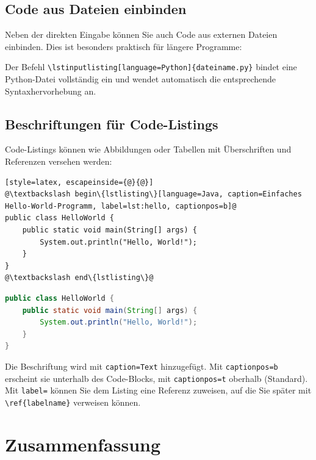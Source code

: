 \subsection{Code aus Dateien einbinden}

Neben der direkten Eingabe können Sie auch Code aus externen Dateien einbinden. Dies ist besonders praktisch für längere Programme:

Der Befehl \texttt{\textbackslash lstinputlisting[language=Python]\{dateiname.py\}} bindet eine Python-Datei vollständig ein und wendet automatisch die entsprechende Syntaxhervorhebung an.



\subsection{Beschriftungen für Code-Listings}

Code-Listings können wie Abbildungen oder Tabellen mit Überschriften und Referenzen versehen werden:

\begin{lstlisting}[style=latex, escapeinside={@}{@}]
@\textbackslash begin\{lstlisting\}[language=Java, caption=Einfaches Hello-World-Programm, label=lst:hello, captionpos=b]@
public class HelloWorld {
    public static void main(String[] args) {
        System.out.println("Hello, World!");
    }
}
@\textbackslash end\{lstlisting\}@
\end{lstlisting}

\begin{ausgabe}
\begin{lstlisting}[language=Java, caption=Einfaches Hello-World-Programm, label=lst:hello, captionpos=b]
public class HelloWorld {
    public static void main(String[] args) {
        System.out.println("Hello, World!");
    }
}
\end{lstlisting}
\end{ausgabe}

Die Beschriftung wird mit \texttt{caption=Text} hinzugefügt. Mit \texttt{captionpos=b} erscheint sie unterhalb des Code-Blocks, mit \texttt{captionpos=t} oberhalb (Standard). Mit \texttt{label=} können Sie dem Listing eine Referenz zuweisen, auf die Sie später mit \texttt{\textbackslash ref\{labelname\}} verweisen können.



\section{Zusammenfassung}

